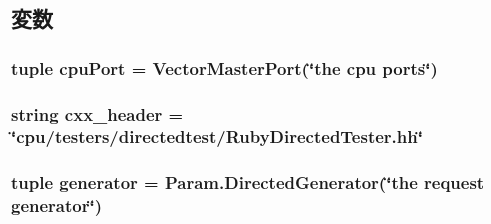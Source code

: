 \subsection{変数}
\hypertarget{classRubyDirectedTester_1_1RubyDirectedTester_ace8800036ae574a5768b4b672759f660}{
\subsubsection[{cpuPort}]{\setlength{\rightskip}{0pt plus 5cm}tuple {\bf cpuPort} = VectorMasterPort(\char`\"{}the cpu {\bf ports}\char`\"{})}}
\label{classRubyDirectedTester_1_1RubyDirectedTester_ace8800036ae574a5768b4b672759f660}
\hypertarget{classRubyDirectedTester_1_1RubyDirectedTester_a17da7064bc5c518791f0c891eff05fda}{
\subsubsection[{cxx\_\-header}]{\setlength{\rightskip}{0pt plus 5cm}string {\bf cxx\_\-header} = \char`\"{}cpu/testers/directedtest/RubyDirectedTester.hh\char`\"{}}}
\label{classRubyDirectedTester_1_1RubyDirectedTester_a17da7064bc5c518791f0c891eff05fda}
\hypertarget{classRubyDirectedTester_1_1RubyDirectedTester_a0227bb2583fecef99335cf93d701a476}{
\subsubsection[{generator}]{\setlength{\rightskip}{0pt plus 5cm}tuple {\bf generator} = Param.DirectedGenerator(\char`\"{}the request {\bf generator}\char`\"{})}}
\label{classRubyDirectedTester_1_1RubyDirectedTester_a0227bb2583fecef99335cf93d701a476}
